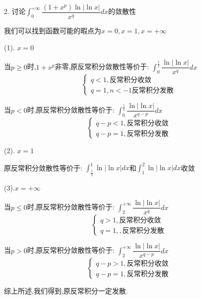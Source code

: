 2. 讨论$\int_{0}^{+\infty}\dfrac{(1+x^p)\ln|\ln x|}{x^q}dx$的敛散性
\begin{solution}

	我们可以找到函数可能的暇点为$x=0,x=1,x=+\infty$
	
	(1). $x=0$
	
	当$p\geq 0$时,$1+x^{p}$非零,原反常积分敛散性等价于:  $\int_{0}^{\frac{1}{2}}\dfrac{\ln|\ln x|}{x^q}dx$
	$$\left\lbrace
	\begin{array}{l}
		q<1,\text{反常积分收敛}\\
		q=1,n<-1\text{反常积分发散}
	\end{array}
	\right. $$
	
	当$p<0$时,原反常积分敛散性等价于:  $\int_{0}^{\frac{1}{2}}\dfrac{\ln|\ln x|}{x^{q-p}}dx$
	$$\left\lbrace
	\begin{array}{l}
		q-p<1,\text{反常积分收敛}\\
		q-p=1,\text{反常积分发散}
	\end{array}
	\right. $$
	
	(2). $x=1$
	
	原反常积分敛散性等价于:  $\int_{\frac{1}{2}}^{1}\ln|\ln x|dx$和$\int_{1}^{2}\ln|\ln x|dx$收敛
	
	(3).$x=+\infty$
	
	当$p\leq 0$时,原反常积分敛散性等价于:  $\int_{2}^{+\infty}\dfrac{\ln|\ln x|}{x^q}dx$
	$$\left\lbrace
	\begin{array}{l}
		q>1,\text{反常积分收敛}\\
		q=1,,\text{反常积分发散}
	\end{array}
	\right. $$
	
	当$p>0$时,原反常积分敛散性等价于:  $\int_{2}^{+\infty}\dfrac{\ln|\ln x|}{x^{q-p}}dx$
	$$\left\lbrace
	\begin{array}{l}
		q-p>1,\text{反常积分收敛}\\
		q-p=1,\text{反常积分发散}
	\end{array}
	\right. $$
	
	综上所述,我们得到,原反常积分一定发散.
	
\end{solution}

